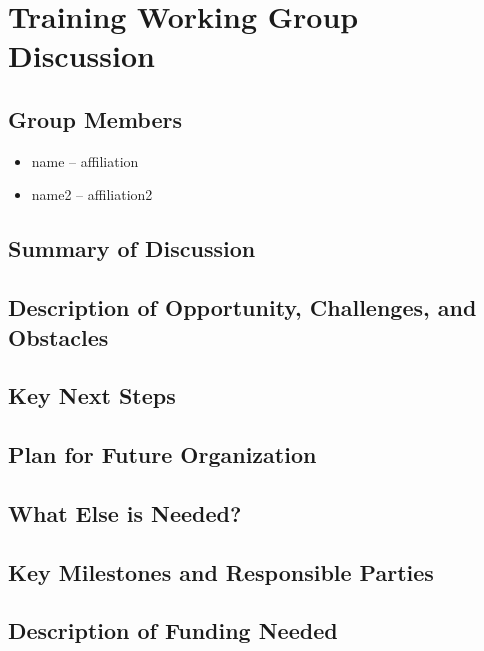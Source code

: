 \section{Training Working Group Discussion}
\label{sec:appendix_training}


\subsection{Group Members}

\begin{itemize}
\item name -- affiliation
\item name2 -- affiliation2
\end{itemize}

\subsection{Summary of Discussion}

\subsection{Description of Opportunity, Challenges, and Obstacles}


\subsection{Key Next Steps}


\subsection{Plan for Future Organization}


\subsection{What Else is Needed?}


\subsection{Key Milestones and Responsible Parties}


\subsection{Description of Funding Needed}
